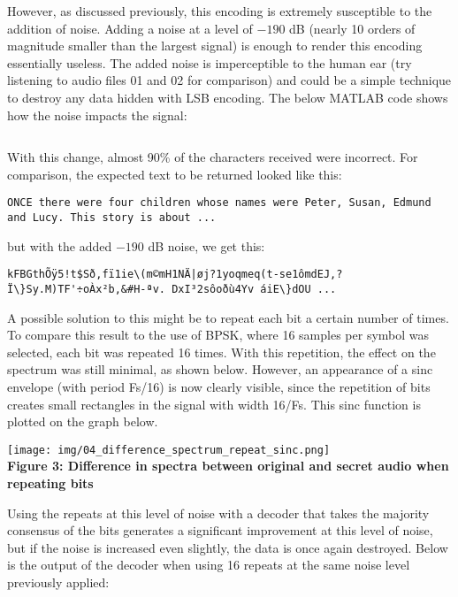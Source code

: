 \documentclass{article}
\begin{document}
However, as discussed previously, this encoding is extremely susceptible to
the addition of noise. Adding a noise at a level of $-190$ dB (nearly 10 orders
of magnitude smaller than the largest signal) is enough to render this encoding
essentially useless. The added noise is imperceptible to the human ear (try
listening to audio files 01 and 02 for comparison) and could be a simple
technique to destroy any data hidden with LSB encoding. The below MATLAB code
shows how the noise impacts the signal:

\inputminted[xleftmargin=24pt, linenos=true, breaklines, firstline=38, lastline=39]{matlab}{project_code.m}

With this change, almost 90\% of the characters received were incorrect. For
comparison, the expected text to be returned looked like this:

\begin{verbatim}
ONCE there were four children whose names were Peter, Susan, Edmund 
and Lucy. This story is about ...
\end{verbatim}

but with the added $-190$ dB noise, we get this:

\begin{verbatim}
kFBGthÕÿ5!t$Sð,fï1ie\(m©mH1NÄ|øj?1yoqmeq(t-se1ômdEJ,?Ï\}Sy.M)TF'÷oÀx²b,&#H-ªv. DxI³2sôoðù4Yv áiE\}dOU ...
\end{verbatim}

A possible solution to this might be to repeat each bit a certain number of
times. To compare this result to the use of BPSK, where 16 samples per
symbol was selected, each bit was repeated 16 times. With this repetition, the
effect on the spectrum was still minimal, as shown below. However, an appearance
of a sinc envelope (with period Fs/16) is now clearly visible, since the
repetition of bits creates small rectangles in the signal with width 16/Fs. This
sinc function is plotted on the graph below.

\begin{center}
  \texttt{[image: img/04\_difference\_spectrum\_repeat\_sinc.png]} \\
  \textbf{Figure 3: Difference in spectra between original and secret audio when repeating bits}
\end{center}

Using the repeats at this level of noise with a decoder that takes the majority
consensus of the bits generates a significant improvement at this level of
noise, but if the noise is increased even slightly, the data is once again
destroyed. Below is the output of the decoder when using 16 repeats at the same
noise level previously applied:
\end{document}
